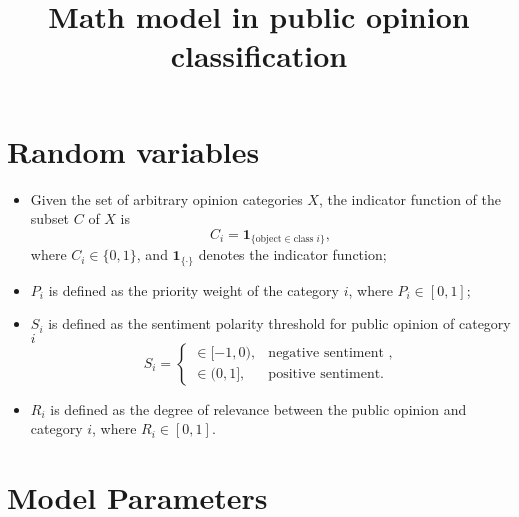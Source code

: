 \documentclass{article}
\numberwithin{equation}{section}
\begin{document}
\title{Math model in public opinion classification}
\author{}
\maketitle
\thispagestyle{empty}
\clearpage

\maketitle
\tableofcontents
\thispagestyle{empty}
\newpage
\setcounter{page}{1}
\clearpage

\maketitle

\section*{Random variables}

\begin{itemize}

    \item  Given the set of arbitrary opinion categories $X$, the indicator function of the subset $C$ of $X$ is 
    \[
    C_i = \mathbf{1}_{\{\text{object} \in \text{class } i\}},
    \]
where $ C_i \in \{0, 1\} $, and $ \mathbf{1}_{\{\cdot\}} $ denotes the indicator function;

    \item $ P_i $ is defined as the priority weight of the category $ i $, where $ P_i \in [0,1]$;
    
    \item $ S_i $ is defined as the sentiment polarity threshold for public opinion of category $ i $
    \[
    S_i =
    \begin{cases}
    \in [-1,0), & \text{negative sentiment }, \\
    \in (0,1], & \text{positive sentiment}.
    \end{cases}
    \]
    
    \item $ R_i $ is defined as the degree of relevance between the public opinion and category $ i $, where $ R_i \in [0,1] $.

\end{itemize}

\section*{Model Parameters}
\end{document}
